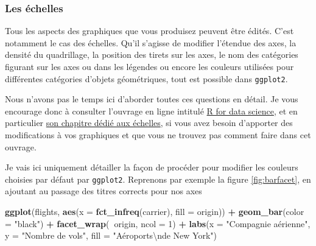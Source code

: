 \documentclass[a4paperpaper,]{article}
\newenvironment{Shaded}{\begin{snugshade}}{\end{snugshade}}
\newcommand{\KeywordTok}[1]{\textcolor[rgb]{0.13,0.29,0.53}{\textbf{#1}}}
\newcommand{\DataTypeTok}[1]{\textcolor[rgb]{0.13,0.29,0.53}{#1}}
\newcommand{\DecValTok}[1]{\textcolor[rgb]{0.00,0.00,0.81}{#1}}
\newcommand{\CharTok}[1]{\textcolor[rgb]{0.31,0.60,0.02}{#1}}
\newcommand{\StringTok}[1]{\textcolor[rgb]{0.31,0.60,0.02}{#1}}
\newcommand{\OperatorTok}[1]{\textcolor[rgb]{0.81,0.36,0.00}{\textbf{#1}}}
\newcommand{\NormalTok}[1]{#1}
\theoremstyle{definition}
\theoremstyle{definition}
\theoremstyle{definition}
\theoremstyle{remark}
\begin{document}
\subsubsection{Les échelles}\label{les-echelles}

Tous les aspects des graphiques que vous produisez peuvent être édités.
C'est notamment le cas des échelles. Qu'il s'agisse de modifier
l'étendue des axes, la densité du quadrillage, la position des tirets
sur les axes, le nom des catégories figurant sur les axes ou dans les
légendes ou encore les couleurs utilisées pour différentes catégories
d'objets géométriques, tout est possible dans \texttt{ggplot2}.

Nous n'avons pas le temps ici d'aborder toutes ces questions en détail.
Je vous encourage donc à consulter l'ouvrage en ligne intitulé
\href{http://r4ds.had.co.nz/}{R for data science}, et en particulier
\href{http://r4ds.had.co.nz/graphics-for-communication.html\#scales}{son
chapitre dédié aux échelles}, si vous avez besoin d'apporter des
modifications à vos graphiques et que vous ne trouvez pas comment faire
dans cet ouvrage.

Je vais ici uniquement détailler la façon de procéder pour modifier les
couleurs choisies par défaut par \texttt{ggplot2}. Reprenons par exemple
la figure \ref{fig:barfacet}, en ajoutant au passage des titres corrects
pour nos axes

\begin{Shaded}
\begin{Highlighting}[]
\KeywordTok{ggplot}\NormalTok{(flights, }\KeywordTok{aes}\NormalTok{(}\DataTypeTok{x =} \KeywordTok{fct_infreq}\NormalTok{(carrier), }\DataTypeTok{fill =}\NormalTok{ origin)) }\OperatorTok{+}
\StringTok{  }\KeywordTok{geom_bar}\NormalTok{(}\DataTypeTok{color =} \StringTok{"black"}\NormalTok{) }\OperatorTok{+}
\StringTok{  }\KeywordTok{facet_wrap}\NormalTok{(}\OperatorTok{~}\NormalTok{origin, }\DataTypeTok{ncol =} \DecValTok{1}\NormalTok{) }\OperatorTok{+}
\StringTok{  }\KeywordTok{labs}\NormalTok{(}\DataTypeTok{x =} \StringTok{"Compagnie aérienne"}\NormalTok{,}
       \DataTypeTok{y =} \StringTok{"Nombre de vols"}\NormalTok{,}
       \DataTypeTok{fill =} \StringTok{"Aéroports}\CharTok{\textbackslash{}n}\StringTok{de New York"}\NormalTok{)}
\end{Highlighting}
\end{Shaded}
\end{document}
